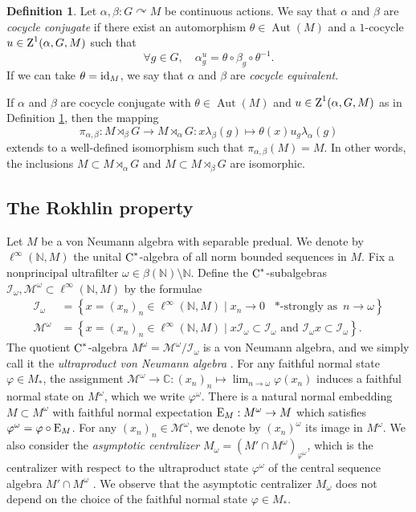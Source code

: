 \documentclass[a4paper,11pt]{amsart}
\numberwithin{equation}{section}
\theoremstyle{definition}
\newtheorem{definition}[theorem]{Definition}
\newcommand{\C}{\mathbb{C}}
\newcommand{\N}{\mathbb{N}}
\newcommand{\id}{\text{\rm id}}
\newcommand{\Aut}{\operatorname{Aut}}
\newcommand{\rZ}{\mathord{\text{\rm Z}}}
\newcommand{\rC}{\mathord{\text{\rm C}}}
\newcommand{\rE}{\mathord{\text{\rm E}}}
\begin{document}
\begin{definition}\label{cocycle conjugacy}
Let $\alpha, \beta : G \curvearrowright M$ be continuous actions. We say that $\alpha$ and $\beta$ are {\em cocycle conjugate} if there exist an automorphism $\theta \in \Aut(M)$ and a $1$-cocycle $u \in \rZ^1(\alpha, G, M)$ such that 
$$\forall g \in G, \quad \alpha^u_g = \theta \circ \beta_g \circ \theta^{-1}.$$
If we can take $\theta=\id_M$, we say that $\alpha$ and $\beta$ are {\em cocycle equivalent}.
\end{definition}


If $\alpha$ and $\beta$ are cocycle conjugate with $\theta \in \Aut(M)$ and $u \in \rZ^1(\alpha, G, M)$ as in Definition \ref{cocycle conjugacy}, then the mapping 
$$\pi_{\alpha, \beta} : M \rtimes_\beta G \to M \rtimes_\alpha G : x \lambda_\beta(g) \mapsto \theta(x) u_g \lambda_\alpha(g)$$
extends to a well-defined isomorphism such that $\pi_{\alpha, \beta}(M) = M$. In other words, the inclusions $M \subset M \rtimes_\alpha G$ and $M \subset M \rtimes_\beta G$ are isomorphic.


\subsection{The Rokhlin property}

Let $M$ be a von Neumann algebra with separable predual. We denote by $\ell^\infty(\N, M)$ the unital $\rC^*$-algebra of all norm bounded sequences in $M$. Fix a nonprincipal ultrafilter $\omega \in \beta(\N)\setminus \N$. Define the $\rC^*$-subalgebras $\mathcal I_\omega, \mathcal M^\omega \subset \ell^\infty(\N, M)$ by the formulae
\begin{align*}
	\mathcal I_{\omega} &= \left\{ x = (x_n)_{n} \in \ell^\infty(\N, M) \mid x_n \to 0 \text{ $\ast$-strongly as } n \to \omega \right\} \\
	\mathcal M^{\omega} &= \left \{ x = (x_n)_n \in \ell^\infty(\N, M) \mid  x \mathcal I_{\omega} \subset \mathcal I_{\omega} \text{ and } \mathcal I_{\omega}x \subset \mathcal I_{\omega}\right\}.
\end{align*}
The quotient $\rC^*$-algebra $M^\omega = \mathcal{M}^\omega/ \mathcal{I}_\omega$ is a von Neumann algebra, and we simply call it the \textit{ultraproduct von Neumann algebra} \cite{Oc85}. For any faithful normal state $\varphi\in M_*$, the assignment $\mathcal M^\omega \to \C : (x_n)_n \mapsto \lim_{n\to \omega} \varphi(x_n)$ induces a faithful normal state on $M^\omega$, which we write $\varphi^\omega$. 
There is a natural normal embedding $M \subset M^\omega$ with faithful normal expectation $\rE_M : M^\omega \to M$ which satisfies $\varphi^\omega = \varphi \circ \rE_M$. For any $(x_n)_n\in \mathcal M^\omega$, we denote by $(x_n)^\omega$ its image in $M^\omega$. We also consider the {\em asymptotic centralizer} $M_\omega = (M' \cap M^\omega)_{\varphi^{\omega}}$, which is the centralizer with respect to the ultraproduct state $\varphi^\omega$ of the central sequence algebra $M' \cap M^\omega$ \cite{Co74, AH12}. We observe that the asymptotic centralizer $M_\omega$ does not depend on the choice of the faithful normal state $\varphi \in M_\ast$.
\end{document}
